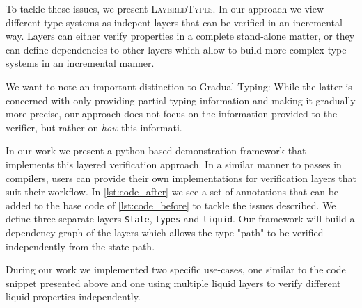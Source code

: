 \documentclass{easychair}
\newcommand{\LayeredTypes}{\textsc{LayeredTypes}}
\begin{document}
\label{sec:proposed-approach}

To tackle these issues, we present \LayeredTypes. In our approach we view different type systems as indepent layers that can be verified in an incremental way. Layers can either verify properties in a complete stand-alone matter, or they can define dependencies to other layers which allow to build more complex type systems in an incremental manner.

We want to note an important distinction to Gradual Typing\cite{gradual}: While the latter is concerned with only providing partial typing information and making it gradually more precise, our approach does not focus on the information provided to the verifier, but rather on \textit{how} this informati.

In our work we present a python-based demonstration framework that implements this layered verification approach. In a similar manner to passes in compilers, users can provide their own implementations for verification layers that suit their workflow. In \autoref{lst:code_after} we see a set of annotations that can be added to the base code of \autoref{lst:code_before} to tackle the issues described. We define three separate layers \texttt{State}, \texttt{types} and \texttt{liquid}. Our framework will build a dependency graph of the layers which allows the type "path" to be verified independently from the state path.

During our work we implemented two specific use-cases, one similar to the code snippet presented above and one using multiple liquid layers to verify different liquid properties independently.



\end{document}
